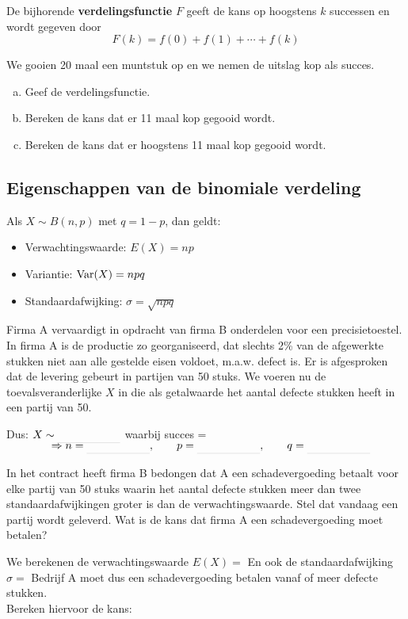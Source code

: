 \documentclass[a4paper,12pt, twoside]{article}
\begin{document}
\begin{mdframed}
De bijhorende {\bf verdelingsfunctie} $F$ geeft de kans op hoogstens $k$ successen en wordt gegeven door
$$ F(k)=f(0) + f(1) + \cdots + f(k)$$
\end{mdframed}

\begin{oefening}
We gooien 20 maal een muntstuk op en we nemen de uitslag kop als succes.
\begin{enumerate}[(a)]
  \item Geef de verdelingsfunctie.
  \item Bereken de kans dat er 11 maal kop gegooid wordt.
  \item Bereken de kans dat er hoogstens 11 maal kop gegooid wordt.
\end{enumerate}
\end{oefening}

\needspace{5cm}

\subsection{Eigenschappen van de binomiale verdeling}

\begin{mdframed}
Als $X \sim B(n,p)$ met $q=1-p$, dan geldt:
\begin{itemize}
  \item Verwachtingswaarde: $E(X)=np$
  \item Variantie: $\Var(X)=npq$
  \item Standaardafwijking: $\sigma = \sqrt{npq}$
\end{itemize}
\end{mdframed}

\begin{oefening}
Firma A vervaardigt in opdracht van firma B onderdelen voor een precisietoestel. In firma A is de productie zo georganiseerd, dat slechts 2\% van de afgewerkte stukken niet aan alle gestelde eisen voldoet, m.a.w. defect is.
Er is afgesproken dat de levering gebeurt in partijen van 50 stuks. We voeren nu de toevalsveranderlijke $X$ in die als getalwaarde het aantal defecte stukken heeft in een partij van 50.

Dus: $X\sim\arule{2cm}$ waarbij succes = \arule{3cm}\\
$\qquad\qquad\Rightarrow  n=\arule{2cm}, \qquad p=\arule{2cm}, \qquad q=\arule{2cm}$

In het contract heeft firma B bedongen dat A een schadevergoeding betaalt voor elke partij van 50 stuks waarin het aantal defecte stukken meer dan twee standaardafwijkingen groter is dan de verwachtingswaarde. Stel dat vandaag een partij wordt geleverd. Wat is de kans dat firma A een schadevergoeding moet betalen?

We berekenen de verwachtingswaarde $E(X)=$\arulefill
En ook de standaardafwijking $\sigma=$\arulefill
Bedrijf A moet dus een schadevergoeding betalen vanaf \arule{1cm} of meer defecte stukken.\\
Bereken hiervoor de kans:
\end{oefening}
\end{document}
